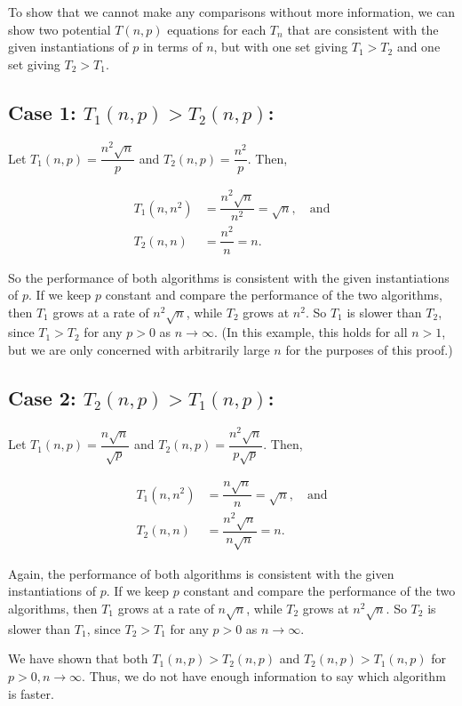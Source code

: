 \documentclass[twoside,10pt]{article}
\newcommand{\aln}[1]{\begin{align*}#1\end{align*}}
\begin{document}
\quad To show that we cannot make any comparisons without more information, we can show two potential $T(n,p)$ equations for each $T_n$ that are consistent with the given instantiations of $p$ in terms of $n$, but with one set giving $T_1 > T_2$ and one set giving $T_2 > T_1$.

\subsection{Case 1: $T_1(n, p) > T_2(n, p)$:}

\quad Let $T_1(n, p) = \dfrac{n^2\sqrt{n}}{p}$ and $T_2(n, p) = \dfrac{n^2}{p}$.
Then,

\aln{
  T_1(n, n^2) &= \dfrac{n^2\sqrt{n}}{n^2} = \sqrt{n}, \quad \text{and}\\
  T_2(n, n) &= \dfrac{n^2}{n} = n.
}

\quad So the performance of both algorithms is consistent with the given instantiations of $p$.
If we keep $p$ constant and compare the performance of the two algorithms, then $T_1$ grows at a rate of $n^2\sqrt{n}$, while $T_2$ grows at $n^2$.
So $T_1$ is slower than $T_2$, since $T_1 > T_2$ for any $p > 0$ as $n \to \infty$.
(In this example, this holds for all $n > 1$, but we are only concerned with arbitrarily large $n$ for the purposes of this proof.)

\subsection{Case 2: $T_2(n, p) > T_1(n, p)$:}

\quad Let $T_1(n, p) = \dfrac{n\sqrt{n}}{\sqrt{p}}$ and $T_2(n, p) = \dfrac{n^2\sqrt{n}}{p\sqrt{p}}$.
Then,

\aln{
  T_1(n, n^2) &= \dfrac{n\sqrt{n}}{n} = \sqrt{n}, \quad \text{and}\\
  T_2(n, n) &= \dfrac{n^2\sqrt{n}}{n\sqrt{n}} = n.
}

\quad Again, the performance of both algorithms is consistent with the given instantiations of $p$.
If we keep $p$ constant and compare the performance of the two algorithms, then $T_1$ grows at a rate of $n\sqrt{n}$, while $T_2$ grows at $n^2\sqrt{n}$.
So $T_2$ is slower than $T_1$, since $T_2 > T_1$ for any $p > 0$ as $n \to \infty$.

\hbox{}

\quad We have shown that both $T_1(n, p) > T_2(n, p)$ and $T_2(n, p) > T_1(n, p)$ for $p > 0, n \to \infty$.
Thus, we do not have enough information to say which algorithm is faster.
\end{document}
